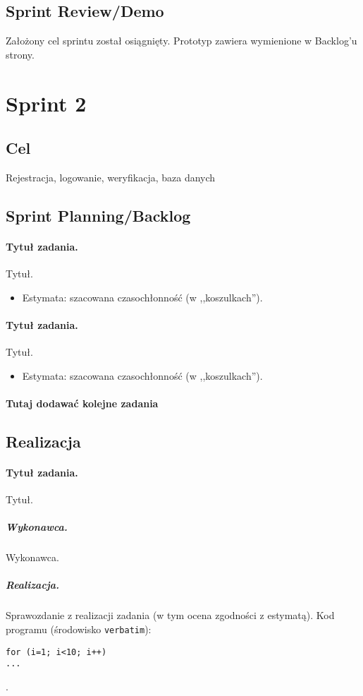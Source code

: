 \documentclass[a4paper]{article}
\begin{document}
\subsection{Sprint Review/Demo}
Założony cel sprintu został osiągnięty. Prototyp zawiera wymienione w Backlog'u strony. 

\section{Sprint 2}

\subsection{Cel} Rejestracja, logowanie, weryfikacja, baza danych 

\subsection{Sprint Planning/Backlog}

\paragraph{Tytuł zadania.} Tytuł.
\begin{itemize}
\item Estymata: szacowana czasochłonność (w ,,koszulkach'').
\end{itemize}

\paragraph{Tytuł zadania.} Tytuł.
\begin{itemize}
\item Estymata: szacowana czasochłonność (w ,,koszulkach'').
\end{itemize}

\paragraph{Tutaj dodawać kolejne zadania}

\subsection{Realizacja}

\paragraph{Tytuł zadania.} Tytuł.
\subparagraph{Wykonawca.} Wykonawca.
\subparagraph{Realizacja.} Sprawozdanie z realizacji zadania (w tym ocena zgodności z estymatą). Kod programu (środowisko \texttt{verbatim}): \begin{verbatim}
for (i=1; i<10; i++)
...
\end{verbatim}.
\end{document}
